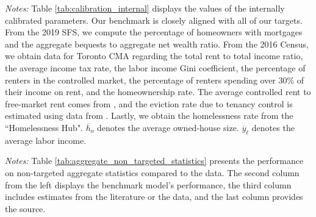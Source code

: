 \documentclass[parskip=full]{article}
\newenvironment{fignote2}[1]
{
\par
\medskip
\begin{minipage}{#1}
\footnotesize
}
{
\end{minipage}
}
\begin{document}
\begin{table}[H]
    \centering
    \caption{Internally assigned parameter values}
    \vspace{-0.5cm}
    \label{tab:calibration_internal}
    
    \vspace{-0.45cm}
    \begin{fignote2}{0.87\textwidth}
    \textit{Notes:} Table \ref{tab:calibration_internal} displays the values of the internally calibrated parameters. Our benchmark is closely aligned with all of our targets. From the 2019 SFS, we compute the percentage of homeowners with mortgages and the aggregate bequests to aggregate net wealth ratio. From the 2016 Census, we obtain data for Toronto CMA regarding the total rent to total income ratio, the average income tax rate, the labor income Gini coefficient, the percentage of renters in the controlled market, the percentage of renters spending over 30\% of their income on rent, and the homeownership rate. The average controlled rent to free-market rent comes from \citet{zhang-gou}, and the eviction rate due to tenancy control is estimated using data from \citet{LeonIveniuk2020}. Lastly, we obtain the homelessness rate from the ``Homelessness Hub". $\overline{h}_{o}$ denotes the average owned-house size. $\overline{y}_{\ell}$ denotes the average labor income.
    \end{fignote2}
\end{table}

\begin{table}[H]
    \centering
    \caption{Aggregate non-targeted statistics}
    \vspace{-0.5cm}
    \label{tab:aggregate_non_targeted_statistics}  
    \vspace{-0.45cm}
    \begin{fignote2}{0.84\textwidth}
      \textit{Notes:} Table \ref{tab:aggregate_non_targeted_statistics} presents the performance on non-targeted aggregate statistics compared to the data. The second column from the left displays the benchmark model's performance, the third column includes estimates from the literature or the data, and the last column provides the source.
    \end{fignote2}
\end{table}
\end{document}
